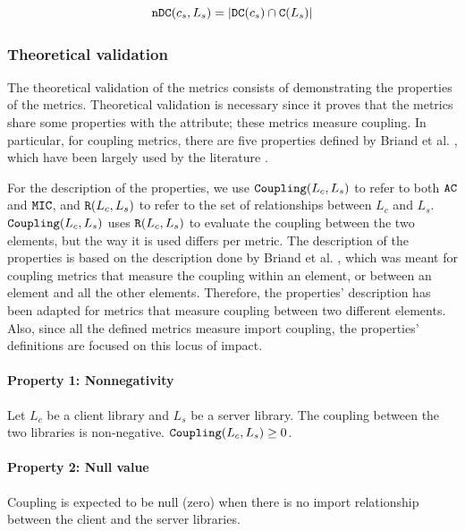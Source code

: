 \begin{equation}
\label{eqn:ac-ndc}
    \verb|nDC|(c_s, L_s) = |\verb|DC|(c_s) \cap \verb|C|(L_s)|
\end{equation}

\subsubsection{Theoretical validation}
The theoretical validation of the metrics consists of demonstrating the properties of the metrics. Theoretical validation is necessary since it proves that the metrics share some properties with the attribute; these metrics measure coupling. In particular, for coupling metrics, there are five properties defined by Briand et al. \cite{briand1996property}, which have been largely used by the literature \cite{poshyvanyk2006conceptual, allen1999measuring, zhao2004measuring}.

For the description of the properties, we use $\verb|Coupling|(L_c, L_s)$ to refer to both $\verb|AC|$ and $\verb|MIC|$, and $\verb|R|(L_c, L_s)$ to refer to the set of relationships between $L_c$ and $L_s$. $\verb|Coupling|(L_c, L_s)$ uses $\verb|R|(L_c, L_s)$ to evaluate the coupling between the two elements, but the way it is used differs per metric. The description of the properties is based on the description done by Briand et al. \cite{briand1996property}, which was meant for coupling metrics that measure the coupling within an element, or between an element and all the other elements. Therefore, the properties' description has been adapted for metrics that measure coupling between two different elements. Also, since all the defined metrics measure import coupling, the properties' definitions are focused on this locus of impact.

\paragraph{Property 1: Nonnegativity}

Let $L_c$ be a client library and $L_s$ be a server library. The coupling between the two libraries is non-negative. $\verb|Coupling|(L_c, L_s) \ge 0$.

\paragraph{Property 2: Null value}
Coupling is expected to be null (zero) when there is no import relationship between the client and the server libraries.

